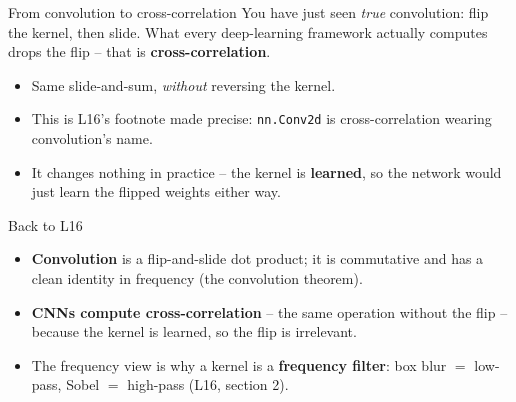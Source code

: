 \documentclass[aspectratio=43]{beamer}
\begin{document}


\begin{frame}{From convolution to cross-correlation}
  You have just seen \emph{true} convolution: flip the kernel, then slide. What every
  deep-learning framework actually computes drops the flip -- that is
  \textbf{cross-correlation}.
  \vfill
  \begin{itemize}\small
    \item Same slide-and-sum, \emph{without} reversing the kernel.
    \item This is L16's footnote made precise: \texttt{nn.Conv2d} is cross-correlation
      wearing convolution's name.
    \item It changes nothing in practice -- the kernel is \textbf{learned}, so the network
      would just learn the flipped weights either way.
  \end{itemize}
  \vfill
\end{frame}



\begin{frame}{Back to L16}
  \begin{itemize}\small
    \item \textbf{Convolution} is a flip-and-slide dot product; it is commutative and has a
      clean identity in frequency (the convolution theorem).
    \item \textbf{CNNs compute cross-correlation} -- the same operation without the flip --
      because the kernel is learned, so the flip is irrelevant.
    \item The frequency view is why a kernel is a \textbf{frequency filter}: box blur $=$
      low-pass, Sobel $=$ high-pass (L16, section 2).
  \end{itemize}
  \vfill
\end{frame}
\end{document}
